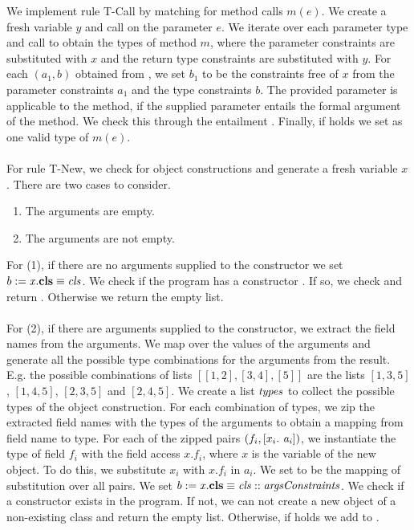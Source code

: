 %
We implement rule T-Call by matching for method calls $m(e)$.
We create a fresh variable $y$
and call  on the parameter $e$.
We iterate over each parameter type 
and call  to obtain
the types of method $m$,
where the parameter constraints are substituted with $x$
and the return type constraints are substituted with $y$.
For each $(a_1, b)$ obtained from ,
we set $b_1$ to be the constraints free of $x$
from the parameter constraints $a_1$
and the type constraints $b$.
The provided parameter is applicable to the method,
if the supplied parameter entails the formal argument of the method.
We check this through the entailment .
Finally, if  holds
we set  as one valid type of $m(e)$.\\
\\
For rule T-New, we check for object constructions 
and generate a fresh variable $x$.
There are two cases to consider.
%
\begin{enumerate}
  \item The arguments are empty.
  \item The arguments are not empty.
\end{enumerate}
%
For (1), if there are no arguments supplied to the constructor
we set $b := \mathit{x}.\textbf{cls} \equiv \mathit{cls}$.
We check if the program has a constructor .
If so, we check 
and return .
Otherwise we return the empty list.\\
\\
For (2), if there are arguments supplied to the constructor,
we extract the field names from the arguments.
We map 
over the values of the arguments
and generate all the possible type combinations
for the arguments from the result.
E.g. the possible combinations of lists $[[1, 2], [3, 4], [5]]$
are the lists $[1, 3, 5]$, $[1, 4, 5]$, $[2, 3, 5]$ and $[2, 4, 5]$.
We create a list $\mathit{types}$ to collect
the possible types of the object construction.
For each combination of types,
we zip the extracted field names
with the types of the arguments
to obtain a mapping from field name to type.
For each of the zipped pairs $(f_i, [x_i.\ \mathit{a_i}])$,
we instantiate the type of field $f_i$
with the field access $x.f_i$,
where $x$ is the variable of the new object.
To do this, we substitute $x_i$ with $x.f_i$ in $a_i$.
We set  to be the mapping of
substitution  over all pairs.
We set $b := \mathit{x}.\textbf{cls} \equiv \mathit{cls} :: \mathit{argsConstraints}$.
We check if a constructor 
exists in the program.
If not, we can not create a new object of a non-existing class
and return the empty list.
Otherwise, if 
holds we add  to .





